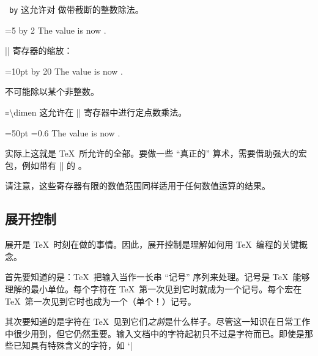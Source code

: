 \documentclass[a4paper,doc2]{ltxdoc}
\begin{document}
\begin{command}{\divide{}\texttt{ by}}
	这允许对  做带截断的整数除法。
\begin{codeexample}[]
=5
\divide{} by 2
The value is now \the{}.
\end{codeexample}

	|\dimen| 寄存器的缩放：
\begin{codeexample}[]
=10pt
\divide{} by 20
The value is now \the{}.
\end{codeexample}

	不可能除以某个非整数。
\end{command}

\begin{command}{\dimen{}\texttt{=}\textbackslash dimen}
	这允许在 |\dimen| 寄存器中进行定点数乘法。
\begin{codeexample}[]
=50pt
=0.6
The value is now \the{}.
\end{codeexample}
\end{command}

实际上这就是 \TeX\ 所允许的全部。要做一些 ``真正的'' 算术，需要借助强大的宏包，例如带有 |\pgfmathparse| 的 \PGF。

请注意，这些寄存器有限的数值范围同样适用于任何数值运算的结果。


\subsection{展开控制}
\label{sec:expansion:control}
展开是 \TeX\ 时刻在做的事情。因此，展开控制是理解如何用 \TeX\ 编程的关键概念。

首先要知道的是：\TeX\ 把输入当作一长串 ``记号'' 序列来处理。记号是 \TeX\ 能够理解的最小单位。每个字符在 \TeX\ 第一次见到它时就成为一个记号。每个宏在 \TeX\ 第一次见到它时也成为一个（单个！）记号。

其次要知道的是字符在 \TeX\ 见到它们\emph{之前}是什么样子。尽管这一知识在日常工作中很少用到，但它仍然重要。输入文档中的字符起初只不过是字符而已。即使是那些已知具有特殊含义的字符，如 `|%
\end{document}
